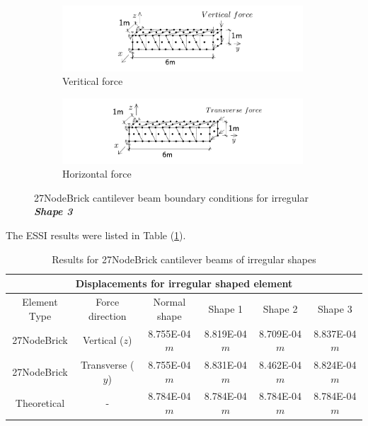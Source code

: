 \documentclass[fleqn,11pt]{article}
\begin{document}
\begin{figure}[H]
  \centering
    \begin{subfigure}{0.5\textwidth}
      \centering
      \includegraphics[width=9cm]{../Figure-files/beam_brick27_shape3_vertical.pdf}
      \caption{Veritical force}
    \end{subfigure}
    \begin{subfigure}{0.5\textwidth}
      \centering
      \includegraphics[width=9cm]{../Figure-files/beam_brick27_shape3_horizontal.pdf}
      \caption{Horizontal force}
    \end{subfigure}
  \caption{27NodeBrick cantilever beam boundary conditions for irregular \textbf{\emph{Shape 3}} }
  \label{fig 27NodeBrick cantilever beam boundary conditions shape 3}
\end{figure}


The ESSI results were listed in Table (\ref{table Results for 27NodeBrick cantilever beams of irregular shapes}). 
\begin{table}[H]
  \centering
  \caption{Results for 27NodeBrick cantilever beams of irregular shapes}
  \label{table Results for 27NodeBrick cantilever beams of irregular shapes}
  \begin{tabular}{|c|c|c|c|c|c|}
    \hline 
    \multicolumn{6}{|c|}{Displacements for irregular shaped element}   \\ \hline
    Element Type   & Force direction & Normal shape & Shape 1 & Shape 2 & Shape 3  \\ \hline 
    27NodeBrick     & Vertical ($z$)     & 8.755E-04 $m$  & 8.819E-04 $m$ & 8.709E-04 $m$ & 8.837E-04 $m$   \\ \hline
    27NodeBrick     & Transverse ($y$)   & 8.755E-04 $m$  & 8.831E-04 $m$ & 8.462E-04 $m$ & 8.824E-04 $m$   \\ \hline
    Theoretical    &      -              & 8.784E-04 $m$  & 8.784E-04 $m$ & 8.784E-04 $m$ & 8.784E-04 $m$ \\ \hline
  \end{tabular}
\end{table}
\end{document}
